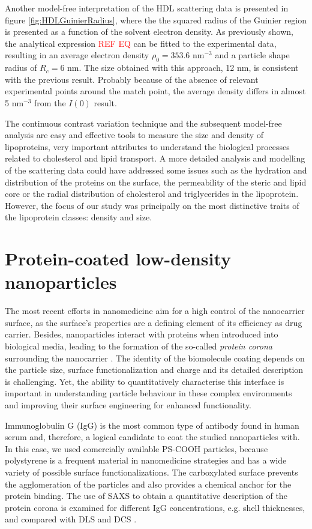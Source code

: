 Another model-free interpretation of the HDL scattering data is presented in figure \ref{fig:HDLGuinierRadius}, where the the squared radius of the Guinier region is presented as a function of the solvent electron density. As previously shown, the analytical expression \textcolor{red}{REF EQ} can be fitted to the experimental data, resulting in an average electron density $\rho_0=353.6$ nm$^{-3}$ and a particle shape radius of $R_c=6$ nm. The size obtained with this approach, 12 nm, is consistent with the previous result. Probably because of the absence of relevant experimental points around the match point, the average density differs in almost 5 nm$^{-3}$ from the $I(0)$ result.

The continuous contrast variation technique and the subsequent model-free analysis are easy and effective tools to measure the size and density of lipoproteins, very important attributes to understand the biological processes related to cholesterol and lipid transport. A more detailed analysis and modelling of the scattering data could have addressed some issues such as the hydration and distribution of the proteins on the surface, the permeability of the steric and lipid core or the radial distribution of cholesterol and triglycerides in the lipoprotein. However, the focus of our study was principally on the most distinctive traits of the lipoprotein classes: density and size.


\section{Protein-coated low-density nanoparticles}
The most recent efforts in nanomedicine aim for a high control of the nanocarrier surface, as the surface's properties are a defining element of its efficiency as drug carrier. Besides, nanoparticles interact with proteins when introduced into biological media, leading to the formation of the so-called \emph{protein corona} surrounding the nanocarrier \cite{cedervall_understanding_2007,monopoli_physicalchemical_2011,casals_time_2010}. The identity of the biomolecule coating depends on the particle size, surface functionalization and charge \cite{lundqvist_nanoparticle_2008,tenzer_rapid_2013,gessner_functional_2003} and its detailed description is challenging. Yet, the ability to quantitatively characterise this interface is important in understanding particle behaviour in these complex environments and improving their surface engineering for enhanced functionality.

Immunoglobulin G (IgG) is the most common type of antibody found in human serum and, therefore, a logical candidate to coat the studied nanoparticles with. In this case, we used comercially available PS-COOH particles, because polystyrene is a frequent material in nanomedicine strategies and has a wide variety of possible surface functionalizations. The carboxylated surface prevents the agglomeration of the particles and also provides a chemical anchor for the protein binding. The use of SAXS to obtain a quantitative description of the protein corona is examined for different IgG concentrations, e.g. shell thicknesses, and compared with DLS and DCS \cite{minelli_characterization_2014}.


